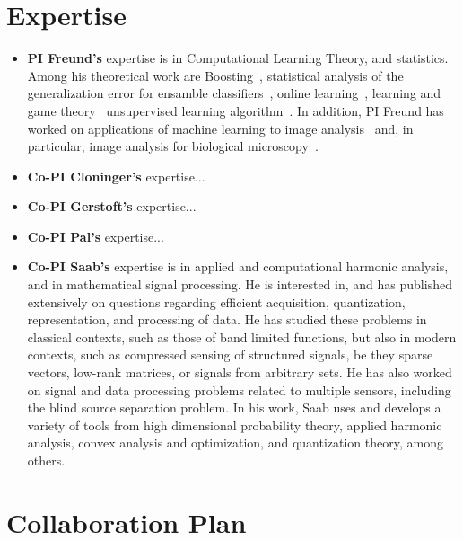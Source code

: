 \documentclass{article}
\begin{document}
\section{Expertise}


\begin{itemize}
\item {\bf PI Freund's} expertise is in Computational Learning Theory,
  and statistics. Among his theoretical work are Boosting~\cite{},
  statistical analysis of the generalization error for ensamble
  classifiers~\cite{}, online learning~\cite{}, learning and game
  theory~\cite{} unsupervised learning algorithm~\cite{}.  In
  addition, PI Freund has worked on applications of machine learning
  to image analysis~{} and, in particular, image analysis for
  biological microscopy~\cite{}.
\item {\bf Co-PI Cloninger's} expertise... 
\item {\bf Co-PI Gerstoft's} expertise... 
\item {\bf Co-PI Pal's} expertise... 
\item {\bf Co-PI Saab's} expertise is in applied and computational harmonic analysis, and in mathematical signal processing. He is interested in, and has published extensively on questions regarding efficient acquisition, quantization, representation, and processing of data. He has studied these problems in classical contexts, such as those of band limited functions, but also in modern contexts, such as compressed sensing of structured signals, be they sparse vectors, low-rank matrices, or signals from arbitrary sets. He has also worked on signal and data processing problems related to multiple sensors, including the blind source separation problem. In his work, Saab uses and develops a variety of tools from high dimensional probability theory, applied harmonic analysis, convex analysis and optimization, and quantization theory, among others. 
\end{itemize}

\section{Collaboration Plan}
\end{document}
